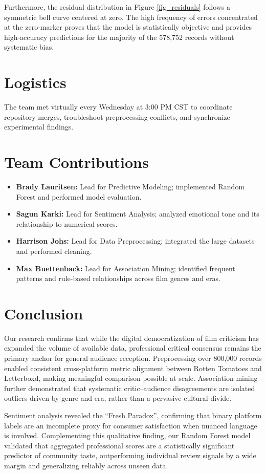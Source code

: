 \documentclass[conference]{IEEEtran}
\begin{document}
Furthermore, the residual distribution in Figure \ref{fig_residuals} follows a symmetric bell curve centered at zero. The high frequency of errors concentrated at the zero-marker proves that the model is statistically objective and provides high-accuracy predictions for the majority of the 578,752 records without systematic bias.
\section{Logistics}
The team met virtually every Wednesday at 3:00 PM CST to coordinate repository merges, troubleshoot preprocessing conflicts, and synchronize experimental findings.

\section{Team Contributions}
\begin{itemize}
  \item \textbf{Brady Lauritsen:} Lead for Predictive Modeling; implemented Random Forest and performed model evaluation.
  \item \textbf{Sagun Karki:} Lead for Sentiment Analysis; analyzed emotional tone and its relationship to numerical scores.
  \item \textbf{Harrison Johs:} Lead for Data Preprocessing; integrated the large datasets and performed cleaning.
  \item \textbf{Max Buettenback:} Lead for Association Mining; identified frequent patterns and rule-based relationships across film genres and eras.
\end{itemize}

\section{Conclusion}
Our research confirms that while the digital democratization of film criticism has expanded the volume of available data, professional critical consensus remains the primary anchor for general audience reception. Preprocessing over 800,000 records enabled consistent cross-platform metric alignment between Rotten Tomatoes and Letterboxd, making meaningful comparison possible at scale. Association mining further demonstrated that systematic critic--audience disagreements are isolated outliers driven by genre and era, rather than a pervasive cultural divide.

Sentiment analysis revealed the \enquote{Fresh Paradox}, confirming that binary platform labels are an incomplete proxy for consumer satisfaction when nuanced language is involved. Complementing this qualitative finding, our Random Forest model validated that aggregated professional scores are a statistically significant predictor of community taste, outperforming individual review signals by a wide margin and generalizing reliably across unseen data.
\end{document}
